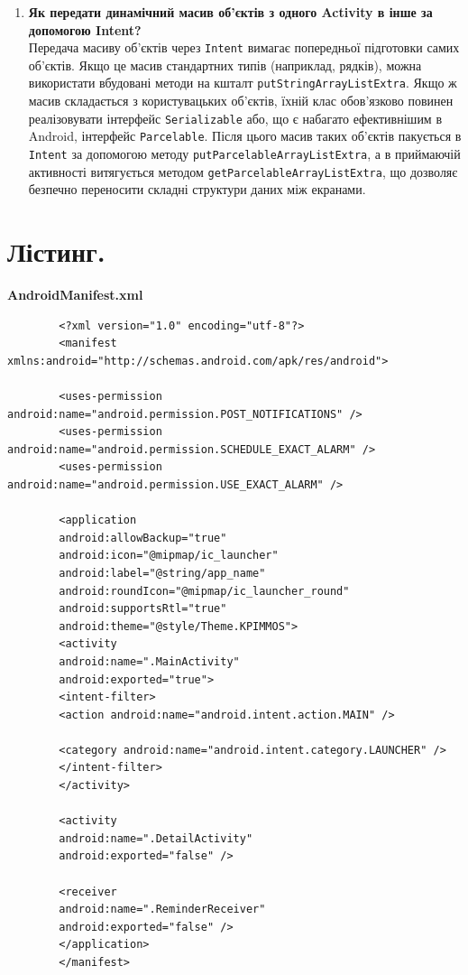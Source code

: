 \documentclass[14pt, a4paper]{extreport}
\begin{document}
\begin{enumerate}
		\item \textbf{Як передати динамічний масив об'єктів з одного Activity в інше за допомогою Intent?} \\ Передача масиву об'єктів через \texttt{Intent} вимагає попередньої підготовки самих об'єктів. Якщо це масив стандартних типів (наприклад, рядків), можна використати вбудовані методи на кшталт \texttt{putStringArrayListExtra}. Якщо ж масив складається з користувацьких об'єктів, їхній клас обов'язково повинен реалізовувати інтерфейс \texttt{Serializable} або, що є набагато ефективнішим в Android, інтерфейс \texttt{Parcelable}. Після цього масив таких об'єктів пакується в \texttt{Intent} за допомогою методу \texttt{putParcelableArrayListExtra}, а в приймаючій активності витягується методом \texttt{getParcelableArrayListExtra}, що дозволяє безпечно переносити складні структури даних між екранами.
	\end{enumerate}
	
	\pagebreak
	
	\section*{Лістинг.}
	
	\textbf{AndroidManifest.xml}
	
	\begin{verbatim} 
		<?xml version="1.0" encoding="utf-8"?>
		<manifest xmlns:android="http://schemas.android.com/apk/res/android">
		
		<uses-permission android:name="android.permission.POST_NOTIFICATIONS" />
		<uses-permission android:name="android.permission.SCHEDULE_EXACT_ALARM" />
		<uses-permission android:name="android.permission.USE_EXACT_ALARM" />
		
		<application
		android:allowBackup="true"
		android:icon="@mipmap/ic_launcher"
		android:label="@string/app_name"
		android:roundIcon="@mipmap/ic_launcher_round"
		android:supportsRtl="true"
		android:theme="@style/Theme.KPIMMOS">
		<activity
		android:name=".MainActivity"
		android:exported="true">
		<intent-filter>
		<action android:name="android.intent.action.MAIN" />
		
		<category android:name="android.intent.category.LAUNCHER" />
		</intent-filter>
		</activity>
		
		<activity
		android:name=".DetailActivity"
		android:exported="false" />
		
		<receiver
		android:name=".ReminderReceiver"
		android:exported="false" />
		</application>
		</manifest>
	\end{verbatim}
	
\end{document}
